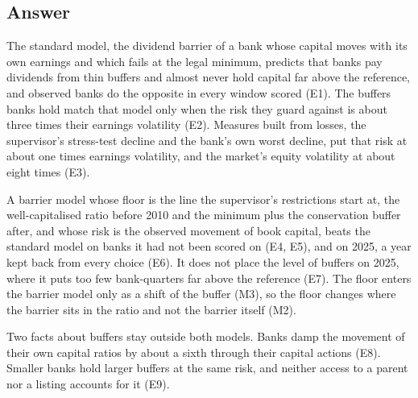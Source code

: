 \subsection{Answer}

The standard model, the dividend barrier of a bank whose capital moves with
its own earnings and which fails at the legal minimum, predicts that banks pay
dividends from thin buffers and almost never hold capital far above the
reference, and observed banks do the opposite in every window scored
(E1). The buffers banks hold match that model only when the risk they guard
against is about three times their earnings volatility (E2). Measures built
from losses, the supervisor's stress-test decline and the bank's own worst
decline, put that risk at about one times earnings volatility, and the
market's equity volatility at about eight times (E3).

A barrier model whose floor is the line the supervisor's restrictions start
at, the well-capitalised ratio before 2010 and the minimum plus the
conservation buffer after, and whose risk is the observed movement of book
capital, beats the standard model on banks it had not been scored on (E4,
E5), and on 2025, a year kept back from every choice (E6). It does not place
the level of buffers on 2025, where it puts too few bank-quarters far above
the reference (E7). The floor enters the barrier model only as a shift
of the buffer (M3), so the floor changes where the barrier sits in the ratio
and not the barrier itself (M2).

Two facts about buffers stay outside both models. Banks damp the movement of
their own capital ratios by about a sixth through their capital actions (E8).
Smaller banks hold larger buffers at the same risk, and neither access to a
parent nor a listing accounts for it (E9).

